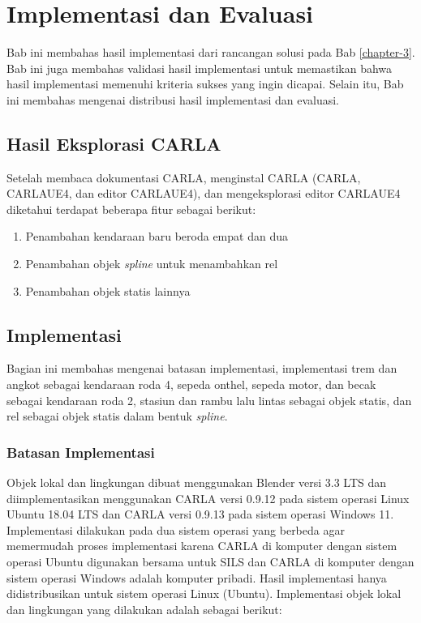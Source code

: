 \chapter{Implementasi dan Evaluasi}

Bab ini membahas hasil implementasi dari rancangan solusi pada Bab
\ref{chapter-3}. Bab ini juga membahas validasi hasil implementasi untuk
memastikan bahwa hasil implementasi memenuhi kriteria sukses yang ingin dicapai.
Selain itu, Bab ini membahas mengenai distribusi hasil implementasi dan
evaluasi.

\section{Hasil Eksplorasi CARLA}

Setelah membaca dokumentasi CARLA, menginstal CARLA (CARLA, CARLAUE4, dan editor
CARLAUE4), dan mengeksplorasi editor CARLAUE4 diketahui terdapat beberapa fitur
sebagai berikut:

\begin{enumerate}
    \item Penambahan kendaraan baru beroda empat dan dua
    \item Penambahan objek \textit{spline} untuk menambahkan rel
    \item Penambahan objek statis lainnya
\end{enumerate}


\section{Implementasi}

Bagian ini membahas mengenai batasan implementasi, implementasi trem dan angkot
sebagai kendaraan roda 4, sepeda onthel, sepeda motor, dan becak sebagai
kendaraan roda 2, stasiun dan rambu lalu lintas sebagai objek statis, dan rel
sebagai objek statis dalam bentuk \textit{spline}.

\subsection{Batasan Implementasi}

Objek lokal dan lingkungan dibuat menggunakan Blender versi 3.3 LTS dan
diimplementasikan menggunakan CARLA versi 0.9.12 pada sistem operasi Linux
Ubuntu 18.04 LTS dan CARLA versi 0.9.13 pada sistem operasi Windows 11.
Implementasi dilakukan pada dua sistem operasi yang berbeda agar memermudah
proses implementasi karena CARLA di komputer dengan sistem operasi Ubuntu
digunakan bersama untuk SILS dan CARLA di komputer dengan sistem operasi Windows
adalah komputer pribadi. Hasil implementasi hanya didistribusikan untuk sistem
operasi Linux (Ubuntu). Implementasi objek lokal dan lingkungan yang dilakukan
adalah sebagai berikut:


